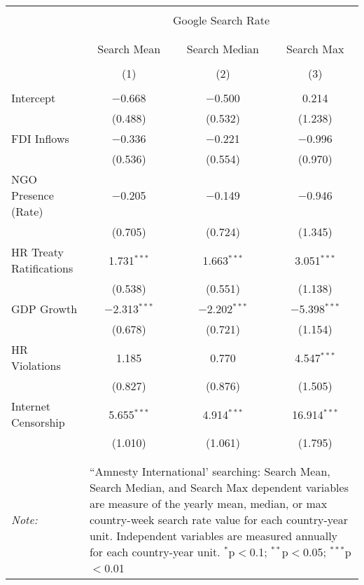 
\begin{table}[!htbp] \centering 
  \caption{} 
  \label{} 
\begin{tabular}{@{\extracolsep{5pt}}lccc} 
\\[-1.8ex]\hline 
\hline \\[-1.8ex] 
 & \multicolumn{3}{c}{Google Search Rate} \\ 
\cline{2-4} 
\\[-1.8ex] & \multicolumn{3}{c}{ } \\ 
 & Search Mean & Search Median & Search Max \\ 
\\[-1.8ex] & (1) & (2) & (3)\\ 
\hline \\[-1.8ex] 
 Intercept & $-$0.668 & $-$0.500 & 0.214 \\ 
  & (0.488) & (0.532) & (1.238) \\ 
  FDI Inflows & $-$0.336 & $-$0.221 & $-$0.996 \\ 
  & (0.536) & (0.554) & (0.970) \\ 
  NGO Presence (Rate) & $-$0.205 & $-$0.149 & $-$0.946 \\ 
  & (0.705) & (0.724) & (1.345) \\ 
  HR Treaty Ratifications & 1.731$^{***}$ & 1.663$^{***}$ & 3.051$^{***}$ \\ 
  & (0.538) & (0.551) & (1.138) \\ 
  GDP Growth & $-$2.313$^{***}$ & $-$2.202$^{***}$ & $-$5.398$^{***}$ \\ 
  & (0.678) & (0.721) & (1.154) \\ 
  HR Violations & 1.185 & 0.770 & 4.547$^{***}$ \\ 
  & (0.827) & (0.876) & (1.505) \\ 
  Internet Censorship & 5.655$^{***}$ & 4.914$^{***}$ & 16.914$^{***}$ \\ 
  & (1.010) & (1.061) & (1.795) \\ 
 \hline \\[-1.8ex] 
\hline 
\hline \\[-1.8ex] 
\textit{Note:}  & \multicolumn{3}{l}{\parbox[t]{8cm}{``Amnesty International' searching: Search Mean, Search Median, and Search Max dependent variables are measure of the yearly mean, median, or max country-week search rate value for each country-year unit. Independent variables are measured annually for each country-year unit. $^{*}$p$<$0.1; $^{**}$p$<$0.05; $^{***}$p$<$0.01}} \\ 
\end{tabular} 
\end{table} 
